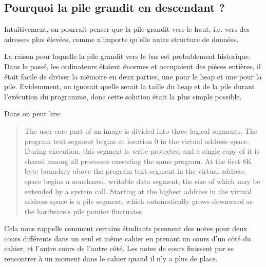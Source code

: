 
\subsection{Pourquoi la pile grandit en descendant ?}
\label{stack_grow_backwards}

Intuitivement, on pourrait penser que la pile grandit vers le haut, i.e. vers des
adresses plus élevées, comme n'importe qu'elle autre structure de données.

La raison pour laquelle la pile grandit vers le bas est probablement historique.
Dans le passé, les ordinateurs étaient énormes et occupaient des pièces entières,
il était facile de diviser la mémoire en deux parties, une pour le \gls{heap} et
une pour la pile.
Evidemment, on ignorait quelle serait la taille du \gls{heap} et de la pile durant
l'exécution du programme, donc cette solution était la plus simple possible.



Dans \RitchieThompsonUNIX on peut lire:

\begin{framed}
\begin{quotation}
The user-core part of an image is divided into three logical segments. The program text segment begins at location 0 in the virtual address space. During execution, this segment is write-protected and a single copy of it is shared among all processes executing the same program. At the first 8K byte boundary above the program text segment in the virtual address space begins a nonshared, writable data segment, the size of which may be extended by a system call. Starting at the highest address in the virtual address space is a pile segment, which automatically grows downward as the hardware's pile pointer fluctuates.
\end{quotation}
\end{framed}

Cela nous rappelle comment certains étudiants prennent des notes pour deux cours différents dans
un seul et même cahier en prenant un cours d'un côté du cahier, et l'autre cours de l'autre côté.
Les notes de cours finissent par se rencontrer à un moment dans le cahier quand il n'y a plus de place.

